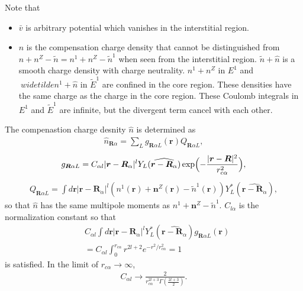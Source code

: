 \documentclass{article}
\begin{document}
Note that 
\begin{itemize}
  \item $\bar{v}$ is arbitrary potential which vanishes in the interstitial region.
  \item $\hat{n}$ is the compensation charge density that cannot be distinguished from $n + n^Z - \widetilde{n} = n^1 + n^Z - \widetilde{n}^1$ when seen from the interstitial region. $\widetilde{n} + \hat{n}$ is a smooth charge density with charge neutrality. ${n}^1 + n^Z$ in $E^1$ and $\ widetilde{n}^1 + \hat{n}$ in $\widetilde{E}^1$ are confined in the core region. These densities have the same charge as the charge in the core region. These Coulomb integrals in $E^1$ and $\widetilde{E}^1$ are infinite, but the divergent term cancel with each other.
\end{itemize}
The compenastion charge  desnity $\hat{n}$ is determined as
\begin{align}
  \hat{n}_{\bm{R}\alpha} = \sum_L g_{\bm{R}\alpha L}(\bm{r}) Q_{\bm{R}\alpha L},
\end{align}
\begin{align}
  g_{\bm{R}\alpha L} = 
  C_{\alpha l} |\bm{r} - \bm{R}_{\alpha} |^l  Y_{L}(\widehat{\bm{r} - \bm{R}_{\alpha}}) 
  \exp \Bigl( - \frac{|\bm{r} - \bm{R}|^2}{r_{c\alpha}^2} \Bigr),
\end{align}
\begin{align}
  Q_{\bm{R}\alpha L} = \int d\bm{r} |\bm{r} - \bm{R}_{\alpha}|^l (n^1(\bm{r}) + \bm{n}^Z(\bm{r}) - \widetilde{n}^1(\bm{r})) Y^*_L (\widehat{\bm{r} - \bm{R}_{\alpha}}),
\end{align}
so that $\hat{n}$ has the same multipole moments as $n^1 + \bm{n}^Z - \widetilde{n}^1$.
$C_{l\alpha}$ is the normalization constant so that
\begin{align}
  &
  C_{\alpha l} \int d\bm{r} |\bm{r} - \bm{R}_{\alpha}|^l Y^*_{L}(\widehat{\bm{r} - \bm{R}_{\alpha}}) g_{\bm{R}\alpha L}(\bm{r})
  \\&=
  C_{\alpha l} \int_0^{r_{c\alpha}} r^{2l+2}e^{-r^2/r_{c\alpha}^2} = 1
\end{align}
is satisfied. In the limit of $r_{c\alpha} \to \infty$, 
\begin{align}
  C_{\alpha l} \to \frac{2}{r_{c\alpha}^{2l+3} \Gamma(\frac{2l+3}{2})}.
\end{align}
\end{document}
